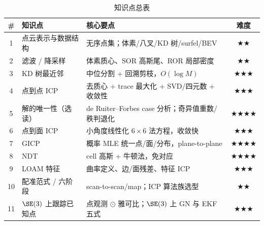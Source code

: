\begin{table}[H]\centering\small
\caption{知识点总表}
\begin{tabular}{cllc}
\toprule
\# & 知识点 & 核心要点 & 难度 \\
\midrule
1 & 点云表示与数据结构 & 无序点集；体素/八叉/KD 树/surfel/BEV & \(\bigstar\bigstar\) \\
2 & 滤波 / 降采样 & 体素质心、SOR 高斯尾、ROR 局部密度 & \(\bigstar\bigstar\) \\
3 & KD 树最近邻 & 中位分割 + 回溯剪枝，$O(\log M)$ & \(\bigstar\bigstar\bigstar\) \\
4 & 点到点 ICP & 去质心 + trace 最大化 + SVD/四元数 + 收敛性 & \(\bigstar\bigstar\bigstar\) \\
5 & 解的唯一性（选读） & de Ruiter--Forbes case 分析；奇异值重数/秩判退化 & \(\bigstar\bigstar\bigstar\bigstar\) \\
6 & 点到面 ICP & 小角度线性化 $6\times6$ 法方程，收敛快 & \(\bigstar\bigstar\bigstar\) \\
7 & GICP & 概率 MLE 统一点/面/分布，plane-to-plane & \(\bigstar\bigstar\bigstar\bigstar\) \\
8 & NDT & cell 高斯 + 牛顿法，免对应 & \(\bigstar\bigstar\bigstar\bigstar\) \\
9 & LOAM 特征 & 曲率定义、边/面残差、特征 ICP & \(\bigstar\bigstar\bigstar\) \\
10 & 配准范式 / 六阶段 & scan-to-scan/map；ICP 算法族选型 & \(\bigstar\bigstar\) \\
11 & $\SE(3)$ 上跟踪已知点 & 点观测 $\odot$ 雅可比；$\SE(3)$ 上 GN 与 EKF 五式 & \(\bigstar\bigstar\bigstar\) \\
\bottomrule
\end{tabular}
\end{table}

